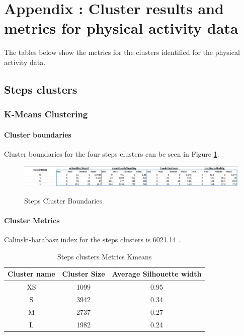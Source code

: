 \documentclass{article}
\begin{document}
\section{Appendix : Cluster results and metrics for physical activity data}

The tables below show the metrics for the clusters identified for the physical activity data. 

\subsection{Steps clusters}

\subsubsection{K-Means Clustering}

\paragraph{Cluster boundaries}
Cluster boundaries for the four steps clusters can be seen in Figure \ref{fig:stepsBoundaries}.

\begin{figure}[H]
  \centering
  \caption{Steps Cluster Boundaries}
  \includegraphics[scale=0.5]{steps_cluster_boundaries.png}
  \label{fig:stepsBoundaries}
\end{figure}

\paragraph{Cluster Metrics}
Calinski-harabasz index for the steps clusters is 6021.14 .

\begin{table}[H]
  \caption{Steps clusters Metrics Kmeans}
  \label{steps_metrics}
  \centering
  \begin{tabular}{ c|c|c}
    \toprule
    \cmidrule(r){1-2}
    Cluster name & Cluster Size & Average Silhouette width \\
    \hline
    XS & 1099 & 0.95 \\
    S & 3942 & 0.34 \\
    M & 2737 & 0.27 \\
    L & 1982 & 0.24 \\
    \bottomrule
    \end{tabular}
\end{table}
\end{document}
